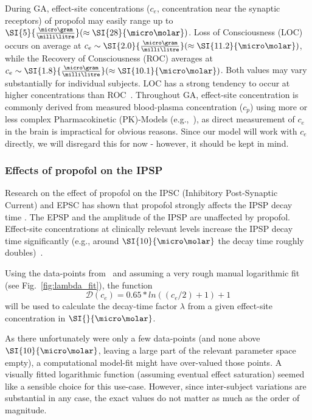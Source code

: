 During GA, effect-site concentrations ($c_{e}$, concentration near the synaptic receptors) of propofol may easily range
up to
$\SI{5}{\frac{\micro\gram}{\milli\litre}} (\approx\SI{28}{\micro\molar})$.
Loss of Consciousness (LOC) occurs on average at $c_e \sim\SI{2.0}{\frac{\micro\gram}{\milli\litre}} (\approx\SI{11
.2}{\micro\molar})$,
while the Recovery of Consciousness (ROC) averages at $c_e \sim\SI{1.8}{\frac{\micro\gram}{\milli\litre}}
(\approx\SI{10.1}{\micro\molar})$.
Both values may vary substantially for individual subjects.
LOC has a strong tendency to occur at higher concentrations than ROC~\cite{iwakiri_individual_2005,
    ferreira_patterns_2020}.
Throughout GA, effect-site concentration is commonly derived from measured
blood-plasma concentration ($c_p$) using more or less complex Pharmacokinetic (PK)-Models
(e.g.,~\cite{eleveld_general_2014, liang_pharmacokinetics-neural_2015}),
as direct measurement of $c_{e}$ in the brain is impractical for obvious reasons.
Since our model will work with $c_{e}$ directly, we will disregard this for now - however, it should be kept in mind.


\subsubsection{Effects of propofol on the IPSP}

Research on the effect of propofol on the IPSC (Inhibitory Post-Synaptic Current) and EPSC
has shown that propofol strongly affects the IPSP decay time \cite{kitamura_effects_2003, mcdougall_propofol_2008}.
The EPSP and the amplitude of the IPSP are unaffected by propofol.
Effect-site concentrations at clinically relevant levels increase the IPSP decay time
significantly (e.g., around $\SI{10}{\micro\molar}$ the decay time roughly doubles)~\cite{kitamura_effects_2003}.


Using the data-points from~\cite{kitamura_effects_2003}
and assuming a very rough manual logarithmic fit (see Fig.~\ref{fig:lambda_fit}),
the function
        \[ \mathscr{D}(c_{e}) = 0.65*ln((c_{e}/2)+1)+1 \]
will be used to calculate the decay-time factor $\lambda$ from a given
effect-site concentration in $\SI{}{\micro\molar}$.

As there unfortunately were only a few data-points (and none above $\SI{10}{\micro\molar}$,
leaving a large part of the relevant parameter space empty),
a computational model-fit might have over-valued those points.
A visually fitted logarithmic function (assuming eventual effect saturation) seemed like a sensible choice
for this use-case.
However, since inter-subject variations are substantial in any case,
the exact values do not matter as much as the order of magnitude.


